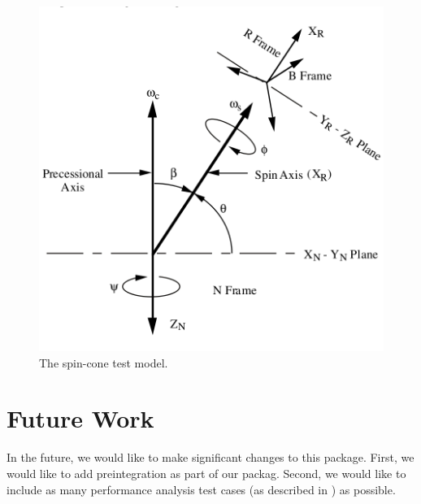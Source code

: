 \documentclass[11pt,a4paper]{article}
\begin{document}
\begin{figure}
	\centering
	\includegraphics[scale=0.3]{spincone}
	\caption{The spin-cone test model.}
	\label{fig:spincone}
\end{figure}

\section{Future Work}

In the future, we would like to make significant changes to this package. First, we would like to add preintegration as part of our packag\cite{Forster:2017,Forster:2015,Eckenhoff:2016}. Second, we would like to include as many performance analysis test cases (as described in \cite{Savage:2009}) as possible.



\end{document}
